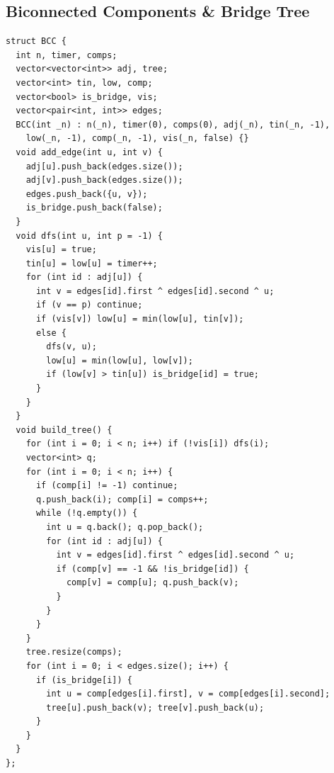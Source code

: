 \subsection{Biconnected Components \texorpdfstring{\&}{\&} Bridge Tree}
\begin{verbatim}
struct BCC {
  int n, timer, comps;
  vector<vector<int>> adj, tree;
  vector<int> tin, low, comp;
  vector<bool> is_bridge, vis;
  vector<pair<int, int>> edges;
  BCC(int _n) : n(_n), timer(0), comps(0), adj(_n), tin(_n, -1),
    low(_n, -1), comp(_n, -1), vis(_n, false) {}
  void add_edge(int u, int v) {
    adj[u].push_back(edges.size());
    adj[v].push_back(edges.size());
    edges.push_back({u, v});
    is_bridge.push_back(false);
  }
  void dfs(int u, int p = -1) {
    vis[u] = true;
    tin[u] = low[u] = timer++;
    for (int id : adj[u]) {
      int v = edges[id].first ^ edges[id].second ^ u;
      if (v == p) continue;
      if (vis[v]) low[u] = min(low[u], tin[v]);
      else {
        dfs(v, u);
        low[u] = min(low[u], low[v]);
        if (low[v] > tin[u]) is_bridge[id] = true;
      }
    }
  }
  void build_tree() {
    for (int i = 0; i < n; i++) if (!vis[i]) dfs(i);
    vector<int> q;
    for (int i = 0; i < n; i++) {
      if (comp[i] != -1) continue;
      q.push_back(i); comp[i] = comps++;
      while (!q.empty()) {
        int u = q.back(); q.pop_back();
        for (int id : adj[u]) {
          int v = edges[id].first ^ edges[id].second ^ u;
          if (comp[v] == -1 && !is_bridge[id]) {
            comp[v] = comp[u]; q.push_back(v);
          }
        }
      }
    }
    tree.resize(comps);
    for (int i = 0; i < edges.size(); i++) {
      if (is_bridge[i]) {
        int u = comp[edges[i].first], v = comp[edges[i].second];
        tree[u].push_back(v); tree[v].push_back(u);
      }
    }
  }
};
\end{verbatim}
